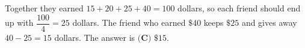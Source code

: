 Together they earned $15+20+25+40=100$ dollars, so each friend should end up with $\dfrac{100}{4}=25$ dollars. The friend who earned $\$40$ keeps $\$25$ and gives away $40-25=15$ dollars. The answer is $\boxed{\textbf{(C) }\$15}$.

